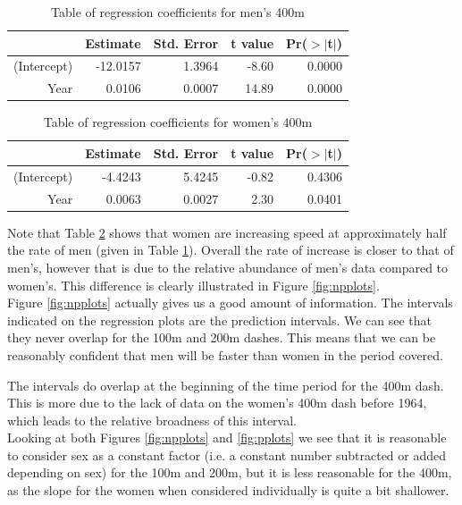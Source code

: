 \documentclass[11pt]{article}
\begin{document}
\begin{table}[ht]
\centering
\begin{tabular}{rrrrr}
  \hline
 & Estimate & Std. Error & t value & Pr($>$$|$t$|$) \\ 
  \hline
(Intercept) & -12.0157 & 1.3964 & -8.60 & 0.0000 \\ 
  Year & 0.0106 & 0.0007 & 14.89 & 0.0000 \\ 
   \hline
\end{tabular}
\caption{Table of regression coefficients for men's 400m}
\label{tab:400m}
\end{table}

\begin{table}[ht]
\centering
\begin{tabular}{rrrrr}
  \hline
 & Estimate & Std. Error & t value & Pr($>$$|$t$|$) \\ 
  \hline
(Intercept) & -4.4243 & 5.4245 & -0.82 & 0.4306 \\ 
  Year & 0.0063 & 0.0027 & 2.30 & 0.0401 \\ 
   \hline
\end{tabular}
\caption{Table of regression coefficients for women's 400m}
\label{tab:400w}
\end{table}

Note that Table \ref{tab:400w} shows that women are increasing speed at approximately half the rate of men (given in Table \ref{tab:400m}). Overall the rate of increase is closer to that of men's, however that is due to the relative abundance of men's data compared to women's. This difference is clearly illustrated in Figure \ref{fig:npplots}. \\

Figure \ref{fig:npplots} actually gives us a good amount of information. The intervals indicated on the regression plots are the prediction intervals. We can see that they never overlap for the 100m and 200m dashes. This means that we can be reasonably confident that men will be faster than women in the period covered.

The intervals do overlap at the beginning of the time period for the 400m dash. This is more due to the lack of data on the women's 400m dash before 1964, which leads to the relative broadness of this interval.\\

Looking at both Figures \ref{fig:npplots} and \ref{fig:pplots} we see that it is reasonable to consider sex as a constant factor (i.e. a constant number subtracted or added depending on sex) for the 100m and 200m, but it is less reasonable for the 400m, as the slope for the women when considered individually is quite a bit shallower. 
\end{document}
